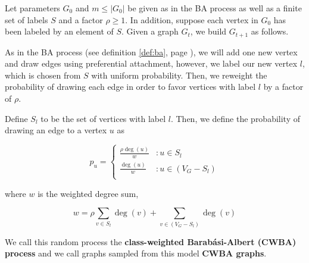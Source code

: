 \begin{definition}
  Let parameters $G_0$ and $m \leq |G_0|$ be given as in the BA process as well
  as a finite set of labels $S$ and a factor $\rho \ge 1$. In addition, suppose
  each vertex in $G_0$ has been labeled by an element of $S$. Given a graph
  $G_t$, we build $G_{t+1}$ as follows.

  As in the BA process (see definition \ref{def:ba}, page \pageref{def:ba}), we will add one new vertex and draw
  edges using preferential attachment, however, we label our new vertex $l$, which is chosen from $S$
  with uniform probability. Then, we reweight the probability of drawing each edge in order to favor
  vertices with label $l$ by a factor of $\rho$.

  Define $S_l$ to be the set of vertices with label $l$. Then, we define the
  probability of drawing an edge to a vertex $u$ as

  \[
    p_u = \begin{cases}
      \frac{\rho\deg(u)}{w} &: u \in S_l\\
      
      \frac{\deg(u)}{w} &: u \in (V_G - S_l)\\
    \end{cases}
  \]

  where $w$ is the weighted degree sum,

  \[
    w = \rho \sum_{v \in S_l}\deg(v) + \sum_{v \in (V_G - S_l)}\deg(v)
  \]

  We call this random process the \textbf{class-weighted Barab\'asi-Albert
    (CWBA) process} and we call graphs sampled from this model \textbf{CWBA
    graphs}.

\end{definition}

